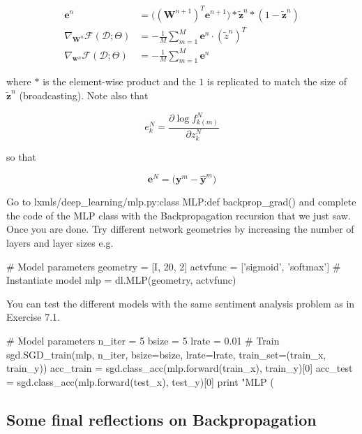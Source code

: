 \begin{align}
\mathbf{e}^{n} & = \Big((\mathbf{W}^{n+1})^T \mathbf{e}^{n+1}\Big) \ast \tilde{\mathbf{z}}^n \ast (1-\tilde{\mathbf{z}}^n)\\
\nabla_{\mathbf{W}^n}\mathcal{F}(\mathcal{D};\Theta) & = - \frac1M \sum_{m=1}^M \mathbf{e}^{n} \cdot \left(\tilde{z}^n\right)^T \\ 
\nabla_{\mathbf{w}^n}\mathcal{F}(\mathcal{D};\Theta) & = - \frac1M \sum_{m=1}^M \mathbf{e}^{n}  
\end{align}

\noindent where $\ast$ is the element-wise product and the $1$ is replicated to match the size of $\tilde{\mathbf{z}}^n$ (broadcasting). Note also that 

\begin{equation}
e^N_k = \frac{\partial \log f_{k(m)}^N}{\partial z^{N}_{k}}  
\label{eq:finalError}
\end{equation}

\noindent so that

\begin{equation}
\mathbf{e}^N =\Big(\mathbf{y}^m - \hat{\mathbf{y}}^m \Big)  
\end{equation}

\begin{exercise}
Go to lxmls/deep\_learning/mlp.py:class MLP:def backprop\_grad() and complete the code of the MLP class with the Backpropagation recursion that we just saw. Once you are done. Try different network geometries by increasing the number of layers and layer sizes e.g.
\begin{python}
# Model parameters
geometry = [I, 20, 2]
actvfunc = ['sigmoid', 'softmax'] 
# Instantiate model
mlp      = dl.MLP(geometry, actvfunc) 
\end{python}
You can test the different models with the same sentiment analysis problem as in Exercise 7.1. 
\begin{python}
# Model parameters
n_iter = 5
bsize  = 5
lrate  = 0.01
# Train
sgd.SGD_train(mlp, n_iter, bsize=bsize, lrate=lrate, train_set=(train_x, train_y))
acc_train = sgd.class_acc(mlp.forward(train_x), train_y)[0]
acc_test  = sgd.class_acc(mlp.forward(test_x), test_y)[0]
print "MLP (%
\end{python}
\end{exercise}

\subsection{Some final reflections on Backpropagation}

